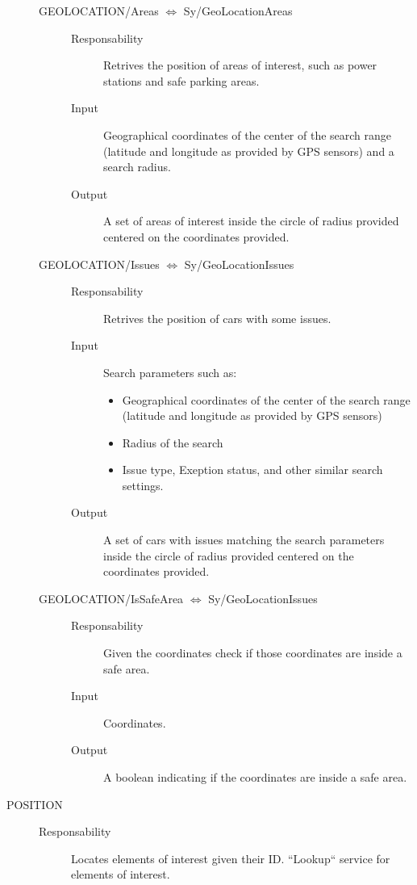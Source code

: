 \documentclass[11pt]{article} %
\begin{document}
\begin{description}
\begin{description}
	\item[GEOLOCATION/Areas $\Leftrightarrow$ Sy/GeoLocationAreas] \hfill
		\begin{description}
			\item[Responsability] Retrives the position of areas of interest, such as power stations and safe parking areas.
			\item[Input] Geographical coordinates of the center of the search range (latitude and longitude as provided by GPS sensors) and a search radius.
			\item[Output] A set of areas of interest inside the circle of radius provided centered on the coordinates provided.
		\end{description}

	\item[GEOLOCATION/Issues $\Leftrightarrow$ Sy/GeoLocationIssues] \hfill
		\begin{description}
			\item[Responsability] Retrives the position of cars with some issues.
			\item[Input] Search parameters such as:
			\begin{itemize}
				\item Geographical coordinates of the center of the search range (latitude and longitude as provided by GPS sensors) 
				\item Radius of the search
				\item Issue type, Exeption status, and other similar search settings.
			\end{itemize}
			\item[Output] A set of cars with issues matching the search parameters inside the circle of radius provided centered on the coordinates provided.
		\end{description}
		
	\item[GEOLOCATION/IsSafeArea $\Leftrightarrow$ Sy/GeoLocationIssues] \hfill
		\begin{description}
			\item[Responsability] Given the coordinates check if those coordinates are inside a safe area.
			\item[Input] Coordinates.
			\item[Output] A boolean indicating if the coordinates are inside a safe area.
		\end{description}
	\end{description}

	\item[POSITION] \hfill
	\begin{description}
		\item[Responsability] Locates elements of interest given their ID. ``Lookup`` service for elements of interest.


\end{description}
\end{description}
\end{document}
